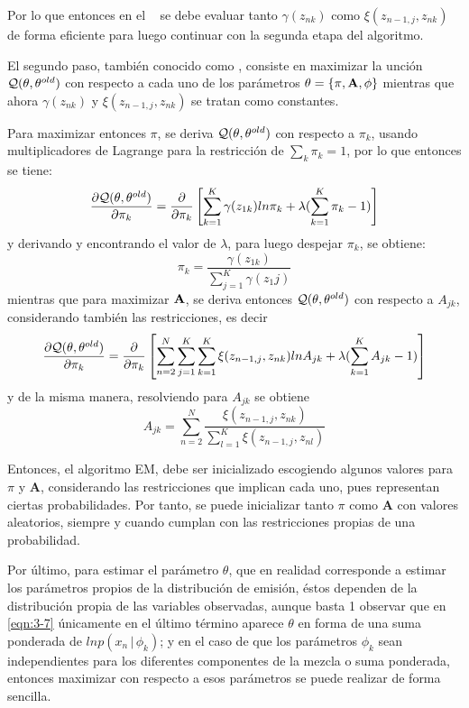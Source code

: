 Por lo que entonces en el \estep~ se debe evaluar tanto $\gamma(z_{nk})$ como $\xi(z_{n-1,j}, z_{nk})$ de forma eficiente para luego continuar con la segunda etapa del algoritmo.

El segundo paso, también conocido como \mstep, consiste en maximizar la unción $\mathcal{Q}(\theta, \theta^{old})$ con respecto a cada uno de los parámetros $\theta = \lbrace \pi, \textbf{A}, \phi \rbrace$ mientras que ahora $\gamma(z_{nk})$ y $\xi(z_{n-1,j}, z_{nk})$ se tratan como constantes.

Para maximizar entonces $\pi$, se deriva $\mathcal{Q}(\theta, \theta^{old})$ con respecto a $\pi_k$, usando multiplicadores de Lagrange para la restricción de $\sum_k \pi_k = 1$, por lo que entonces se tiene: 
\begin{equation*}
  \frac {\partial \mathcal{Q}(\theta, \theta^{old})}{\partial \pi_k} = 
  \frac {\partial}{\partial \pi_k} 
  \left[
    \sum_{k=1}^K \gamma(z_{1k}) ln \pi_k + \lambda (\sum_{k=1}^K \pi_k - 1) 
  \right]
\end{equation*}
y derivando y encontrando el valor de $\lambda$, para luego despejar $\pi_k$, se obtiene:
\begin{equation}
  \pi_k = \frac{\gamma(z_{1k})}{\sum_{j=1}^K \gamma(z_1j)}
\label{eqn:3-8}
\end{equation}
mientras que para maximizar $\textbf{A}$, se deriva entonces $\mathcal{Q}(\theta, \theta^{old})$ con respecto a $A_{jk}$, considerando también las restricciones, es decir
\begin{equation*}
  \frac {\partial \mathcal{Q}(\theta, \theta^{old})}{\partial \pi_k} = 
  \frac {\partial}{\partial \pi_k} 
  \left[
    \sum_{n=2}^N \sum_{j=1}^K \sum_{k=1}^K \xi(z_{n-1,j}, z_{nk}) ln A_{jk} 
    + \lambda (\sum_{k=1}^K A_{jk} - 1) 
  \right]
\end{equation*}
y de la misma manera, resolviendo para $A_{jk}$ se obtiene
\begin{equation}
A_{jk} = \sum_{n=2}^N 
  \frac{\xi(z_{n-1,j}, z_{nk})}
  {\sum_{l=1}^K \xi(z_{n-1,j}, z_{nl})}
\label{eqn:3-9}
\end{equation}

Entonces, el algoritmo \ac{EM}, debe ser inicializado escogiendo algunos valores para $\pi$ y $\mathbf{A}$, considerando las restricciones que implican cada uno, pues representan ciertas probabilidades. Por tanto, se puede inicializar tanto $\pi$ como $\mathbf{A}$ con valores aleatorios, siempre y cuando cumplan con las restricciones propias de una probabilidad. 

Por último, para estimar el parámetro $\theta$, que en realidad corresponde a estimar los parámetros propios de la distribución de emisión, éstos dependen de la distribución propia de las variables observadas, aunque basta 1 observar que en \eqref{eqn:3-7} únicamente en el último término aparece $\theta$ en forma de una suma ponderada de $ln p(x_n \,|\,  \phi_k)$; y en el caso de que los parámetros $\phi_k$ sean independientes para los diferentes componentes de la mezcla o suma ponderada, entonces maximizar con respecto a esos parámetros se puede realizar de forma sencilla.

